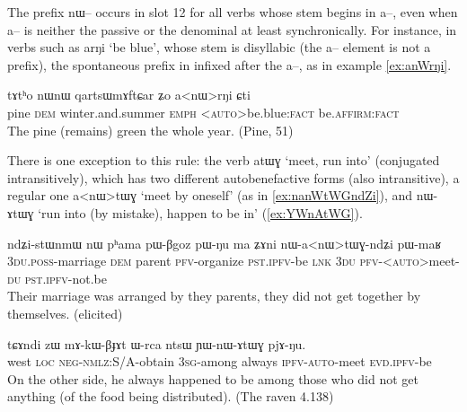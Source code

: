 \documentclass[oldfontcommands,oneside,a4paper,11pt]{article}
\newcommand{\ipa}[1]{{\phon \mbox{#1}}} %
\begin{document}
The prefix \ipa{nɯ--} occurs in slot 12 for all verbs whose stem begins in \ipa{a--}, even when   \ipa{a--} is neither the passive or the denominal at least synchronically. For instance, in verbs such as \ipa{arŋi} `be blue', whose stem is disyllabic (the \ipa{a--} element is not a prefix), the spontaneous prefix in infixed after the \ipa{a--}, as in  example \ref{ex:anWrŋi}.

\begin{exe}
\ex \label{ex:anWrŋi}
\gll 
\ipa{tɤtʰo}  	\ipa{nɯnɯ}  	\ipa{qartsɯmɤftɕar}  	\ipa{ʑo}  	\ipa{a<nɯ>rŋi}  	\ipa{ɕti}  \\
pine \textsc{dem} winter.and.summer \textsc{emph} <\textsc{auto}>be.blue:\textsc{fact} be.\textsc{affirm:fact} \\
\glt The pine (remains) green the whole year. (Pine, 51)
\end{exe}
 
 
 There is one exception to this rule: the verb \ipa{atɯɣ} `meet, run into' (conjugated intransitively), which has two different autobenefactive forms (also intransitive), a regular one \ipa{a<nɯ>tɯɣ} `meet by oneself' (as in \ref{ex:nanWtWGndZi}), and  \ipa{nɯ-ɤtɯɣ}  `run into (by mistake), happen to be in'   (\ref{ex:YWnAtWG}).
 
 \begin{exe}
\ex \label{ex:nanWtWGndZi}
\gll 
\ipa{ndʑi-stɯnmɯ}  	\ipa{nɯ}  	\ipa{pʰama}  	\ipa{pɯ-βgoz}  	\ipa{pɯ-ŋu}  	\ipa{ma}  	\ipa{ʑɤni}  	\ipa{nɯ-a<nɯ>tɯɣ-ndʑi}  	\ipa{pɯ-maʁ}  \\
\textsc{3du.poss}-marriage \textsc{dem} parent \textsc{pfv}-organize \textsc{pst.ipfv}-be \textsc{lnk} \textsc{3du} \textsc{pfv}-<\textsc{auto}>meet-\textsc{du}  \textsc{pst.ipfv}-not.be \\
\glt Their marriage was arranged by they parents, they did not get together by themselves. (elicited)
\end{exe}

 \begin{exe}
\ex \label{ex:YWnAtWG}
\gll 
\ipa{tɕɤndi}  	\ipa{zɯ}  	\ipa{mɤ-kɯ-βɟɤt}  	\ipa{ɯ-rca}  	\ipa{ntsɯ}  	\ipa{ɲɯ-nɯ-ɤtɯɣ}  	\ipa{pjɤ-ŋu.}  \\
west \textsc{loc} \textsc{neg-nmlz}:S/A-obtain \textsc{3sg}-among always \textsc{ipfv-auto}-meet \textsc{evd.ipfv}-be \\
\glt On the other side, he   always happened to be among those who did not get anything (of the food being distributed). (The raven 4.138)
\end{exe}
\end{document}
